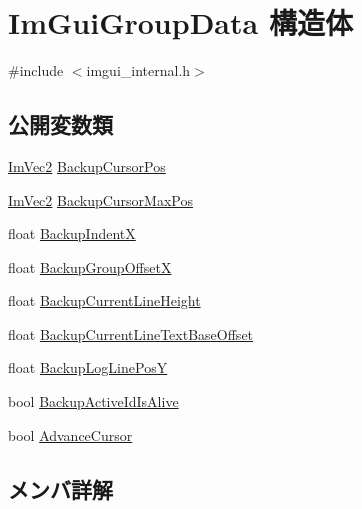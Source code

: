 \hypertarget{struct_im_gui_group_data}{}\section{Im\+Gui\+Group\+Data 構造体}
\label{struct_im_gui_group_data}


{\ttfamily \#include $<$imgui\+\_\+internal.\+h$>$}

\subsection*{公開変数類}
\begin{DoxyCompactItemize}
\item 
\mbox{\hyperlink{struct_im_vec2}{Im\+Vec2}} \mbox{\hyperlink{struct_im_gui_group_data_a8b29e2d9081876fd4847b1cd86c60500}{Backup\+Cursor\+Pos}}
\item 
\mbox{\hyperlink{struct_im_vec2}{Im\+Vec2}} \mbox{\hyperlink{struct_im_gui_group_data_abb83c4db050ef7d20485902cc14c4a0d}{Backup\+Cursor\+Max\+Pos}}
\item 
float \mbox{\hyperlink{struct_im_gui_group_data_a9d39092c1c154ba4809ae79e47baeb64}{Backup\+IndentX}}
\item 
float \mbox{\hyperlink{struct_im_gui_group_data_a0cee1b14b574a4bf883ceb1be58a9332}{Backup\+Group\+OffsetX}}
\item 
float \mbox{\hyperlink{struct_im_gui_group_data_a6e17deccf50138bdf436fa172bb453e2}{Backup\+Current\+Line\+Height}}
\item 
float \mbox{\hyperlink{struct_im_gui_group_data_a3745219bd1f4c6ee5080d8d0aaa8a712}{Backup\+Current\+Line\+Text\+Base\+Offset}}
\item 
float \mbox{\hyperlink{struct_im_gui_group_data_af67f52c70f74a3b7bce8ce46affc856b}{Backup\+Log\+Line\+PosY}}
\item 
bool \mbox{\hyperlink{struct_im_gui_group_data_ac27968bcfd94ba2e4b1543b95d032f35}{Backup\+Active\+Id\+Is\+Alive}}
\item 
bool \mbox{\hyperlink{struct_im_gui_group_data_a2bfc0ee6236ec2ace16634a34eda72d7}{Advance\+Cursor}}
\end{DoxyCompactItemize}


\subsection{メンバ詳解}
\mbox{\label{struct_im_gui_group_data_a2bfc0ee6236ec2ace16634a34eda72d7}} 
